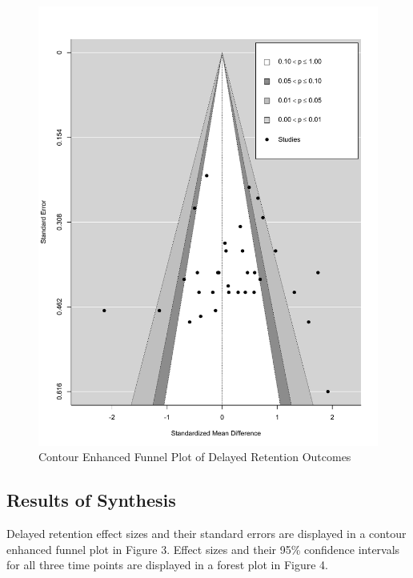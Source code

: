\documentclass[
  english,
  man, donotrepeattitle,mask,floatsintext]{apa7}
\begin{document}
\begin{figure}

{\centering \includegraphics[height=1\textheight]{../../figures/figure3} 

}

\caption{Contour Enhanced Funnel Plot of Delayed Retention Outcomes}\label{fig:fig3}
\end{figure}

\hypertarget{results-of-synthesis}{%
\subsection{Results of Synthesis}\label{results-of-synthesis}}

Delayed retention effect sizes and their standard errors are displayed in a contour enhanced funnel plot in Figure 3. Effect sizes and their 95\% confidence intervals for all three time points are displayed in a forest plot in Figure 4.
\end{document}
